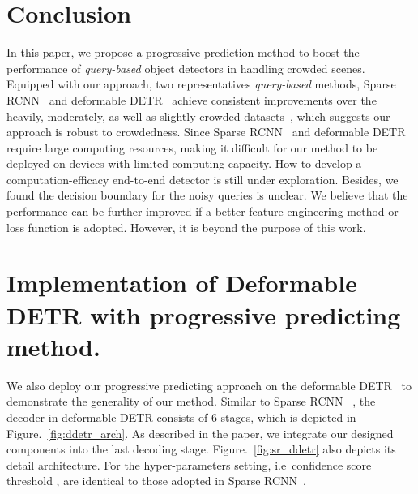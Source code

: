 \documentclass[final]{cvpr}
\begin{document}
\vspace{-0.2cm}
\section{Conclusion}
In this paper, we propose a progressive prediction method to boost the performance of \emph{query-based} object detectors in handling crowded scenes. Equipped with our approach, two representatives \textit{query-based} methods, Sparse RCNN~\cite{sun2020sparse} and deformable DETR~\cite{zhu2021deformable} achieve consistent improvements over the heavily, moderately, as well as slightly crowded datasets~\cite{shao2018crowdhuman, zhang2017citypersons, lin2014microsoft}, which suggests our approach is robust to crowdedness. Since Sparse RCNN~\cite{sun2020sparse} and deformable DETR~\cite{zhu2021deformable} require large computing resources, making it difficult for our method to be deployed on devices with limited computing capacity. How to develop a computation-efficacy end-to-end detector is still under exploration. Besides, we found the decision boundary for the noisy queries is unclear. We believe that the performance can be further improved if a better feature engineering method or loss function is adopted. However, it is beyond the purpose of this work.

\clearpage

  {\small
    
    
  }
\newpage
\appendix
\vspace{-0.4cm}
\section{Implementation of Deformable DETR with progressive predicting method.}

We also deploy our progressive predicting approach on the deformable DETR~\cite{zhu2021deformable} to demonstrate the generality of our method. Similar to Sparse RCNN ~\cite{sun2020sparse}, the decoder in deformable DETR consists of 6 stages, which is depicted in Figure.~\ref{fig:ddetr_arch}. As described in the paper, we integrate our designed components into the last decoding stage. Figure.~\ref{fig:sr_ddetr} also depicts its detail architecture. For the hyper-parameters setting, i.e\ confidence score threshold , are identical to those adopted in Sparse RCNN~\cite{sun2020sparse}.
\end{document}
